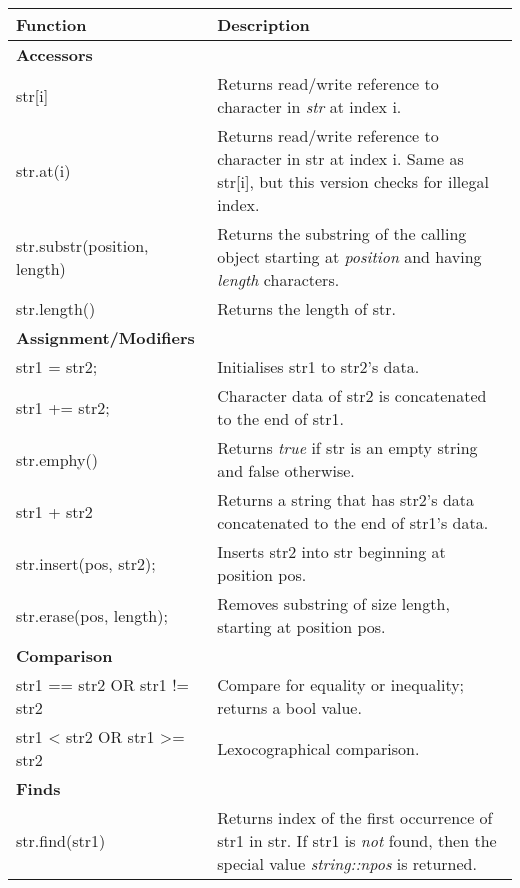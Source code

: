 \begin{table}[H]
\begin{center}
\renewcommand{\arraystretch}{1.5}
\begin{tabular}{m{6cm} m{9cm}}
\textbf{Function} & \textbf{Description}\\
\hline

\textbf{Accessors} &\\
str[i] & Returns read/write reference to character in \emph{str} at index i.\\

str.at(i) & Returns read/write reference to character in str at index i. Same as str[i],
but this version checks for illegal index.\\

str.substr(position, length) & Returns the substring of the calling object starting at \emph{position}
and having \emph{length} characters.\\

str.length() & Returns the length of str.\\

\hline
\textbf{Assignment/Modifiers} &\\
str1 = str2; & Initialises str1 to str2's data.\\

str1 += str2; & Character data of str2 is concatenated to the end of str1.\\

str.emphy() & Returns \emph{true} if str is an empty string and false otherwise.\\

str1 + str2 & Returns a string that has str2's data concatenated to the end of str1's data.\\

str.insert(pos, str2); & Inserts str2 into str beginning at position pos.\\

str.erase(pos, length); & Removes substring of size length, starting at position pos.\\

\hline
\textbf{Comparison} &\\
str1 == str2 OR str1 != str2 & Compare for equality or inequality; returns a bool value.\\

str1 < str2 OR str1 >= str2 & Lexocographical comparison.\\

\hline
\textbf{Finds} &\\
str.find(str1) & Returns index of the first occurrence of str1 in str. If str1 is \emph{not} found,
then the special value \emph{string::npos} is returned.\\


\end{tabular}
\end{center}
\end{table}
